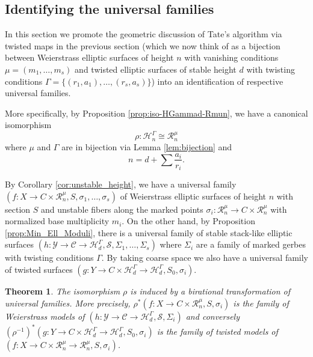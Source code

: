 \documentclass[a4paper,12pt]{amsart}
\newtheorem{thm}{Theorem}[section]
\theoremstyle{definition}
\newcommand{\cY}{\mathcal{Y}}
\newcommand{\cC}{\mathcal{C}}
\newcommand{\cH}{\mathcal{H}}
\newcommand{\cR}{\mathcal{R}}
\newcommand{\cS}{\mathcal{S}}
\begin{document}
	\subsection{Identifying the universal families} 
	
	In this section we promote the geometric discussion of Tate's algorithm via twisted maps in the previous section (which we now think of as a bijection between Weierstrass elliptic surfaces of height $n$ with vanishing conditions $\mu = (m_1, \ldots, m_s)$ and twisted elliptic surfaces of stable height $d$ with twisting conditions $\Gamma = \{(r_1, a_1), \ldots, (r_s, a_s)\}$) into an identification of respective universal families. 
	
	More specifically, by Proposition \ref{prop:iso-HGammad-Rmun}, we have a canonical isomorphism 
	\begin{equation}\label{eqn:outline:iso}
		\rho : \cH^\Gamma_n \cong \cR^\mu_n
	\end{equation}
	where $\mu$ and $\Gamma$ are in bijection via Lemma \ref{lem:bijection} and 
	$$
	n = d + \sum \frac{a_i}{r_i}. 
	$$
	
	By Corollary \ref{cor:unstable_height}, we have a universal family $(f : X \to C \times \cR^\mu_n, S, \sigma_1, \ldots, \sigma_s)$ of Weierstrass elliptic surfaces of height $n$ with section $S$ and unstable fibers along the marked points $\sigma_i : \cR^\mu_n \to C \times \cR^\mu_n$ with normalized base multiplicity $m_i$. On the other hand, by Proposition \ref{prop:Min_Ell_Moduli}, there is a universal family of stable stack-like elliptic surfaces $(h : \cY \to \cC \to \cH^\Gamma_d, \cS, \Sigma_1, \ldots, \Sigma_s)$ where $\Sigma_i$ are a family of marked gerbes with twisting conditions $\Gamma$. By taking coarse space we also have a universal family of twisted surfaces $(g : Y \to C \times \cH^\Gamma_d \to \cH^\Gamma_d, S_0, \sigma_i)$.
	
	\begin{thm}\label{thm:sec7main}
		The isomorphism $\rho$ is induced by a birational transformation of universal families. More precisely, $\rho^*(f : X \to C \times \cR^\mu_n, S, \sigma_i)$ is the family of Weierstrass models of $(h : \cY \to \cC \to \cH^\Gamma_d, \cS, \Sigma_i)$ and conversely $(\rho^{-1})^*(g : Y \to C \times \cH^\Gamma_d \to \cH^\Gamma_d, S_0, \sigma_i)$ is the family of twisted models of $(f : X \to C \times \cR^\mu_n \to \cR^\mu_n, S, \sigma_i)$. 
	\end{thm}
	
\end{document}
